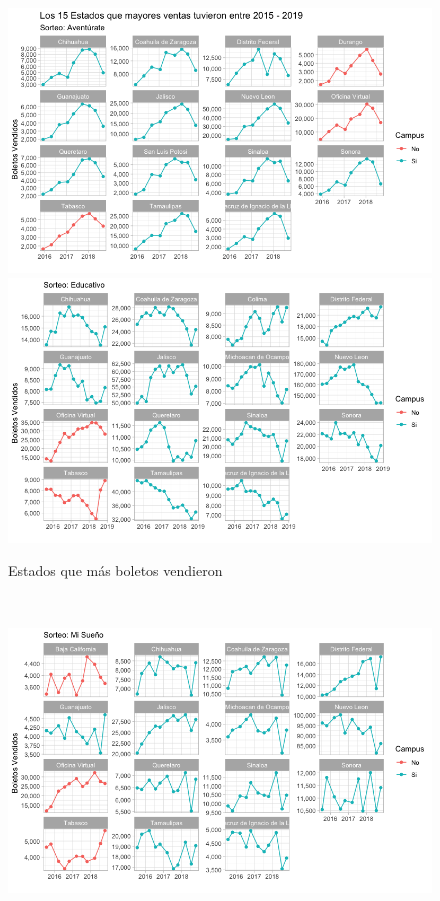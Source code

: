 \begin{figure}[H]
    \caption{Estados que más boletos vendieron}
    \label{fig:bolvendidos_top}
    \includegraphics[scale = 0.5]{Imagenes/aven_15edos.png} \\
    \includegraphics[scale = 0.5]{Imagenes/educ_15edos.png} \\
    \centering
\end{figure} \\

\begin{figure}[H]
    \label{fig:bolvendidos_top2}
    \includegraphics[scale = 0.5]{Imagenes/sue_15edos.png} \\
    \centering
\end{figure} 

